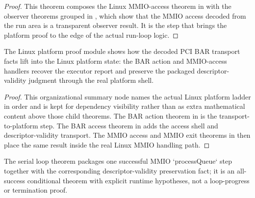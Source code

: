 \begin{proof}
\leanok
{}
This theorem composes the Linux MMIO-access theorem in  with the observer theorems grouped in , which show that the MMIO access decoded from the run area is a transparent observer result.
It is the step that brings the platform proof to the edge of the actual run-loop logic.
\end{proof}

\begin{theorem}
\label{thm:linux-platform-internals}
\leanok
The Linux platform proof module shows how the decoded PCI BAR transport facts lift into the Linux platform state: the BAR action and MMIO-access handlers recover the executor report and preserve the packaged descriptor-validity judgment through the real platform shell.
\end{theorem}

\begin{proof}
\leanok
{}
This organizational summary node names the actual Linux platform ladder in order and is kept for dependency visibility rather than as extra mathematical content above those child theorems.
The BAR action theorem in  is the transport-to-platform step.
The BAR access theorem in  adds the access shell and descriptor-validity transport.
The MMIO access and MMIO exit theorems in  then place the same result inside the real Linux MMIO handling path.
\end{proof}

\begin{theorem}
\label{thm:linux-serial-runtime}
\leanok
The serial loop theorem packages one successful MMIO `processQueue` step together with the corresponding descriptor-validity preservation fact; it is an all-success conditional theorem with explicit runtime hypotheses, not a loop-progress or termination proof.
\end{theorem}

